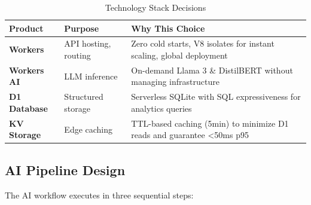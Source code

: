 \documentclass[11pt,a4paper]{article}
\begin{document}
\begin{table}[H]
\centering
\begin{tabular}{p{3cm}p{4cm}p{6cm}}
\toprule
\textbf{Product} & \textbf{Purpose} & \textbf{Why This Choice} \\
\midrule
\textbf{Workers} & API hosting, routing & Zero cold starts, V8 isolates for instant scaling, global deployment \\[0.5em]
\textbf{Workers AI} & LLM inference & On-demand Llama 3 \& DistilBERT without managing infrastructure \\[0.5em]
\textbf{D1 Database} & Structured storage & Serverless SQLite with SQL expressiveness for analytics queries \\[0.5em]
\textbf{KV Storage} & Edge caching & TTL-based caching (5min) to minimize D1 reads and guarantee <50ms p95 \\[0.5em]
\bottomrule
\end{tabular}
\caption{Technology Stack Decisions}
\end{table}

\subsection{AI Pipeline Design}

The AI workflow executes in three sequential steps:
\end{document}
